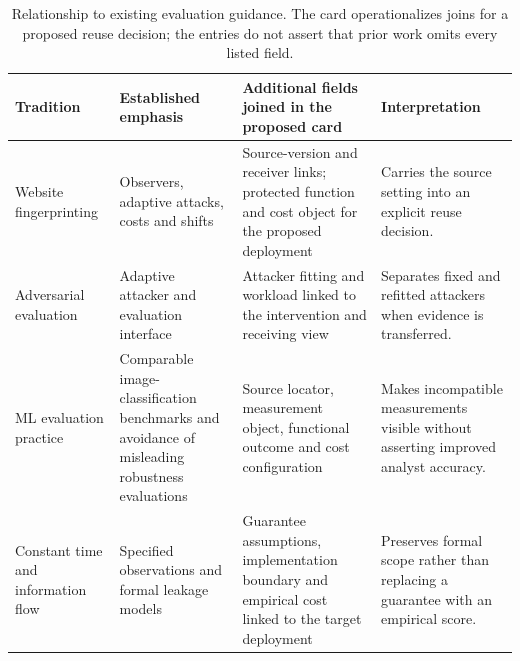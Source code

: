 \begin{table}[t]
\caption{Relationship to existing evaluation guidance. The card operationalizes joins for a proposed reuse decision; the entries do not assert that prior work omits every listed field.}\label{tab:guidance-comparison}
\centering\footnotesize
\begin{tabularx}{\textwidth}{lYYY}\toprule
Tradition & Established emphasis & Additional fields joined in the proposed card & Interpretation \\ \midrule
Website fingerprinting \cite{juarez2014critical,mathews2023critical} & Observers, adaptive attacks, costs and shifts & Source-version and receiver links; protected function and cost object for the proposed deployment & Carries the source setting into an explicit reuse decision. \\
Adversarial evaluation \cite{tramer2020adaptive,carlini2019evaluating} & Adaptive attacker and evaluation interface & Attacker fitting and workload linked to the intervention and receiving view & Separates fixed and refitted attackers when evidence is transferred. \\
ML evaluation practice \cite{croce2021robustbench,carlini2019evaluating} & Comparable image-classification benchmarks and avoidance of misleading robustness evaluations & Source locator, measurement object, functional outcome and cost configuration & Makes incompatible measurements visible without asserting improved analyst accuracy. \\
Constant time and information flow \cite{almeida2016constanttime,smith2009qif} & Specified observations and formal leakage models & Guarantee assumptions, implementation boundary and empirical cost linked to the target deployment & Preserves formal scope rather than replacing a guarantee with an empirical score. \\
\bottomrule\end{tabularx}
\end{table}
